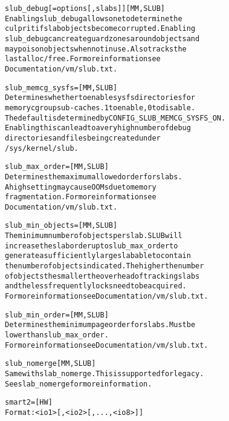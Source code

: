 \documentclass[a4paper,8pt,english]{sphinxmanual}
\begin{document}
\begin{alltt}
        slub\_debug{[}=options{[},slabs{]}{]}    {[}MM, SLUB{]}
                        Enabling slub\_debug allows one to determine the
                        culprit if slab objects become corrupted. Enabling
                        slub\_debug can create guard zones around objects and
                        may poison objects when not in use. Also tracks the
                        last alloc / free. For more information see
                        Documentation/vm/slub.txt.

        slub\_memcg\_sysfs=       {[}MM, SLUB{]}
                        Determines whether to enable sysfs directories for
                        memory cgroup sub-caches. 1 to enable, 0 to disable.
                        The default is determined by CONFIG\_SLUB\_MEMCG\_SYSFS\_ON.
                        Enabling this can lead to a very high number of debug
                        directories and files being created under
                        /sys/kernel/slub.

        slub\_max\_order= {[}MM, SLUB{]}
                        Determines the maximum allowed order for slabs.
                        A high setting may cause OOMs due to memory
                        fragmentation. For more information see
                        Documentation/vm/slub.txt.

        slub\_min\_objects=       {[}MM, SLUB{]}
                        The minimum number of objects per slab. SLUB will
                        increase the slab order up to slub\_max\_order to
                        generate a sufficiently large slab able to contain
                        the number of objects indicated. The higher the number
                        of objects the smaller the overhead of tracking slabs
                        and the less frequently locks need to be acquired.
                        For more information see Documentation/vm/slub.txt.

        slub\_min\_order= {[}MM, SLUB{]}
                        Determines the minimum page order for slabs. Must be
                        lower than slub\_max\_order.
                        For more information see Documentation/vm/slub.txt.

        slub\_nomerge    {[}MM, SLUB{]}
                        Same with slab\_nomerge. This is supported for legacy.
                        See slab\_nomerge for more information.

        smart2=         {[}HW{]}
                        Format: \textless{}io1\textgreater{}{[},\textless{}io2\textgreater{}{[},...,\textless{}io8\textgreater{}{]}{]}


\end{alltt}
\end{document}

